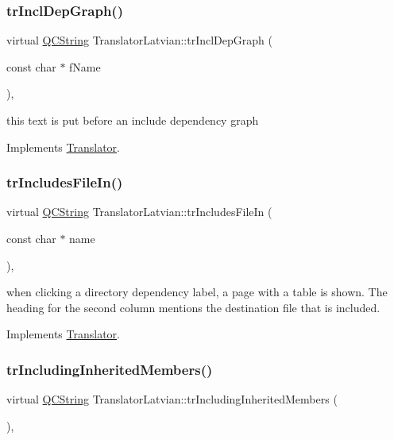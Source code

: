 \subsubsection{\texorpdfstring{trInclDepGraph()}{trInclDepGraph()}}
{\footnotesize\ttfamily virtual \mbox{\hyperlink{class_q_c_string}{Q\+C\+String}} Translator\+Latvian\+::tr\+Incl\+Dep\+Graph (\begin{DoxyParamCaption}\item[{const char $\ast$}]{f\+Name }\end{DoxyParamCaption})\hspace{0.3cm}{\ttfamily [inline]}, {\ttfamily [virtual]}}

this text is put before an include dependency graph 

Implements \mbox{\hyperlink{class_translator}{Translator}}.

\mbox{\label{class_translator_latvian_a265527c54661f8019eec3b4cb5f9548a}} 
\subsubsection{\texorpdfstring{trIncludesFileIn()}{trIncludesFileIn()}}
{\footnotesize\ttfamily virtual \mbox{\hyperlink{class_q_c_string}{Q\+C\+String}} Translator\+Latvian\+::tr\+Includes\+File\+In (\begin{DoxyParamCaption}\item[{const char $\ast$}]{name }\end{DoxyParamCaption})\hspace{0.3cm}{\ttfamily [inline]}, {\ttfamily [virtual]}}

when clicking a directory dependency label, a page with a table is shown. The heading for the second column mentions the destination file that is included. 

Implements \mbox{\hyperlink{class_translator}{Translator}}.

\mbox{\label{class_translator_latvian_a55c496a9d7406b6f74a0d4cab7c31644}} 
\subsubsection{\texorpdfstring{trIncludingInheritedMembers()}{trIncludingInheritedMembers()}}
{\footnotesize\ttfamily virtual \mbox{\hyperlink{class_q_c_string}{Q\+C\+String}} Translator\+Latvian\+::tr\+Including\+Inherited\+Members (\begin{DoxyParamCaption}{ }\end{DoxyParamCaption})\hspace{0.3cm}{\ttfamily [inline]}, {\ttfamily [virtual]}}

